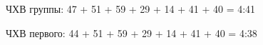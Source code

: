 











ЧХВ группы: 47 + 51 + 59 + 29 + 14 + 41 + 40 = 4:41

ЧХВ первого: 44 + 51 + 59 + 29 + 14 + 41 + 40 = 4:38

    \FloatBarrier

